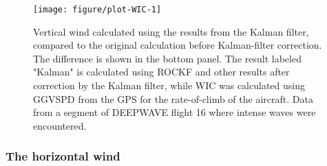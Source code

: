 \documentclass[12pt,twoside,english,12pt,twoside,english]{article}\usepackage[]{graphicx}\usepackage[]{color}
\makeatletter
\def\maxwidth{ %
  \ifdim\Gin@nat@width>\linewidth
    \linewidth
  \else
    \Gin@nat@width
  \fi
}
\newenvironment{knitrout}{}{} %
\makeatother
\begin{document}
\begin{knitrout}
\color{fgcolor}\begin{figure}

{\centering \texttt{[image: figure/plot-WIC-1]} 

}

\caption[Vertical wind calculated using the results from the Kalman filter, compared to the original calculation before Kalman-filter correction.]{Vertical wind calculated using the results from the Kalman filter, compared to the original calculation before Kalman-filter correction. The difference is shown in the bottom panel. The result labeled "Kalman" is calculated using ROCKF and other results after correction by the Kalman filter, while WIC was calculated using GGVSPD from the GPS for the rate-of-climb of the aircraft. Data from a segment of DEEPWAVE flight 16 where intense waves were encountered.}\label{fig:plot-WIC}
\end{figure}


\end{knitrout}

\subsubsection{The horizontal wind}
\end{document}
